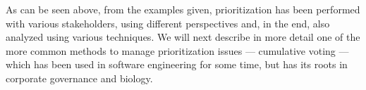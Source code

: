 As can be seen above, from the examples given, prioritization has been performed with various stakeholders, using different perspectives and, in the end, also analyzed using various techniques. We will next describe in more detail one of the more common methods to manage prioritization issues --- cumulative voting --- which has been used in software engineering for some time, but has its roots in corporate governance and biology.